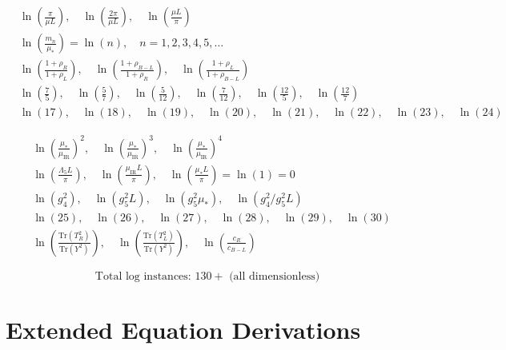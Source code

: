 \documentclass[11pt,a4paper]{article}
\theoremstyle{definition}
\begin{document}
\begin{align}
\label{eq:log_add_11}
&\ln\left(\frac{\pi}{\mu L}\right), \quad \ln\left(\frac{2\pi}{\mu L}\right), \quad \ln\left(\frac{\mu L}{\pi}\right) \\
\label{eq:log_add_12}
&\ln\left(\frac{m_n}{\mu_*}\right) = \ln(n), \quad n = 1, 2, 3, 4, 5, \ldots \\
\label{eq:log_add_13}
&\ln\left(\frac{1 + \rho_R}{1 + \rho_L}\right), \quad \ln\left(\frac{1 + \rho_{B-L}}{1 + \rho_R}\right), \quad \ln\left(\frac{1 + \rho_L}{1 + \rho_{B-L}}\right) \\
\label{eq:log_add_14}
&\ln\left(\frac{7}{5}\right), \quad \ln\left(\frac{5}{7}\right), \quad \ln\left(\frac{5}{12}\right), \quad \ln\left(\frac{7}{12}\right), \quad \ln\left(\frac{12}{5}\right), \quad \ln\left(\frac{12}{7}\right) \\
\label{eq:log_add_15}
&\ln(17), \quad \ln(18), \quad \ln(19), \quad \ln(20), \quad \ln(21), \quad \ln(22), \quad \ln(23), \quad \ln(24)
\end{align}

\begin{align}
\label{eq:log_add_16}
&\ln\left(\frac{\mu_*}{\mu_{\text{IR}}}\right)^2, \quad \ln\left(\frac{\mu_*}{\mu_{\text{IR}}}\right)^3, \quad \ln\left(\frac{\mu_*}{\mu_{\text{IR}}}\right)^4 \\
\label{eq:log_add_17}
&\ln\left(\frac{\Lambda_5 L}{\pi}\right), \quad \ln\left(\frac{\mu_{\text{IR}} L}{\pi}\right), \quad \ln\left(\frac{\mu_* L}{\pi}\right) = \ln(1) = 0 \\
\label{eq:log_add_18}
&\ln(g_4^2), \quad \ln(g_5^2 L), \quad \ln(g_5^2\mu_*), \quad \ln(g_4^2/g_5^2 L) \\
\label{eq:log_add_19}
&\ln(25), \quad \ln(26), \quad \ln(27), \quad \ln(28), \quad \ln(29), \quad \ln(30) \\
\label{eq:log_add_20}
&\ln\left(\frac{\text{Tr}(T^2_R)}{\text{Tr}(Y^2)}\right), \quad \ln\left(\frac{\text{Tr}(T^2_L)}{\text{Tr}(Y^2)}\right), \quad \ln\left(\frac{c_R}{c_{B-L}}\right)
\end{align}

\begin{equation}
\label{eq:log_count}
\text{Total log instances: } 130+ \text{ (all dimensionless)}
\end{equation}

\section{Extended Equation Derivations}
\label{app:eq_extended}
\end{document}
